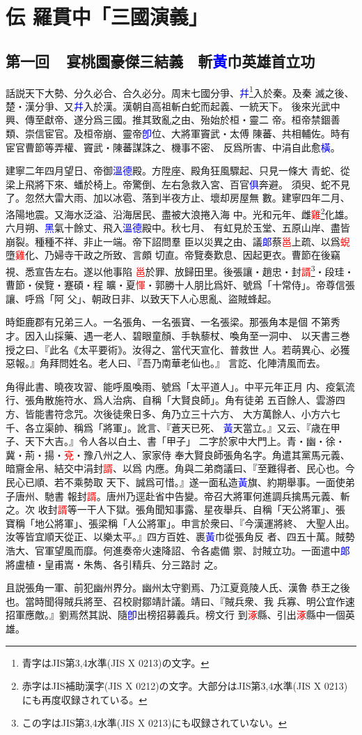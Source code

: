 \documentclass[twocolumn]{utarticle}
\newcommand{\hojo}[1]{\textcolor{red}{#1}}
\newcommand{\newjis}[1]{\textcolor{blue}{#1}}
\begin{document}
\section{伝 羅貫中「三國演義」}

\subsection*{第一回~~宴桃園豪傑三結義　斬\newjis{黃}巾英雄首立功}

話説天下大勢、分久必合、合久必分。周末七國分爭、\newjis{幷}\footnote{青字はJIS第3,4水準(JIS X 0213)の文字。}入於秦。及秦
滅之後、楚・漢分爭、又\newjis{幷}入於漢。漢朝自高祖斬白蛇而起義、一統天下。
後來光武中興、傳至獻帝、遂分爲三國。推其致亂之由、殆始於桓・靈二
帝。桓帝禁錮善類、崇信宦官。及桓帝崩、靈帝\newjis{卽}位、大將軍竇武・太傅
陳蕃、共相輔佐。時有宦官曹節等弄權、竇武・陳蕃謀誅之、機事不密、
反爲所害、中涓自此愈\newjis{橫}。

建寧二年四月望日、帝御\newjis{溫德}殿。方陞座、殿角狂風驟起、只見一條大
青蛇、從梁上飛將下來、蟠於椅上。帝驚倒、左右急救入宮、百官\newjis{俱}奔避。
須臾、蛇不見了。忽然大雷大雨、加以冰雹、落到半夜方止、壞却房屋無
數。建寧四年二月、洛陽地震。又海水泛溢、沿海居民、盡被大浪捲入海
中。光和元年、雌\hojo{雞}\footnote{赤字はJIS補助漢字(JIS X 0212)の文字。大部分はJIS第3,4水準(JIS X 0213)にも再度収録されている。}化雄。六月朔、\newjis{黑}氣十餘丈、飛入\newjis{溫德}殿中。秋七月、
有虹見於玉堂、五原山岸、盡皆崩裂。種種不祥、非止一端。帝下詔問羣
臣以災異之由、議\newjis{郞}蔡\hojo{邕}上疏、以爲\hojo{蜺}墮\hojo{雞}化、乃婦寺干政之所致、言頗
切直。帝覽奏歎息、因起更衣。曹節在後竊視、悉宣告左右。遂以他事陷
\hojo{邕}於罪、放歸田里。後張讓・趙忠・封\hojo{諝}\footnote{この字はJIS第3,4水準(JIS X 0213)にも収録されていない。}・段珪・曹節・侯覽・蹇碩・程
曠・夏\hojo{惲}・郭勝十人朋比爲奸、號爲「十常侍」。帝尊信張讓、呼爲「阿
父」、朝政日非、以致天下人心思亂、盜賊蜂起。

時鉅鹿郡有兄弟三人。一名張角、一名張寶、一名張梁。那張角本是個
不第秀才。因入山採藥、遇一老人、碧眼童顏、手執藜杖、喚角至一洞中、
以天書三巻授之曰、『此名《太平要術》。汝得之、當代天宣化、普救世
人。若萌異心、必獲惡報。』角拜問姓名。老人曰、『吾乃南華老仙也。』
言訖、化陣清風而去。

角得此書、曉夜攻習、能呼風喚雨、號爲「太平道人」。中平元年正月
内、疫氣流行、張角散施符水、爲人治病、自稱「大賢良師」。角有徒弟
五百餘人、雲游四方、皆能書符念咒。次後徒衆日多、角乃立三十六方、
大方萬餘人、小方六七千、各立渠帥、稱爲「將軍」。訛言、『蒼天已死、
\newjis{黃}天當立。』又云、『歳在甲子、天下大吉。』令人各以白土、書「甲子」
二字於家中大門上。青・幽・徐・冀・荊・揚・\hojo{兗}・豫八州之人、家家侍
奉大賢良師張角名字。角遣其黨馬元義、暗齎金帛、結交中涓封\hojo{諝}、以爲
内應。角與二弟商議曰、『至難得者、民心也。今民心已順、若不乘勢取
天下、誠爲可惜。』遂一面私造\newjis{黃}旗、約期舉事。一面使弟子唐州、馳書
報封\hojo{諝}。唐州乃逕赴省中告變。帝召大將軍何進調兵擒馬元義、斬之。次
收封\hojo{諝}等一干人下獄。張角聞知事露、星夜舉兵、自稱「天公將軍」、張
寶稱「地公將軍」、張梁稱「人公將軍」。申言於衆曰、『今漢運將終、
大聖人出。汝等皆宜順天從正、以樂太平。』四方百姓、裹\newjis{黃}巾從張角反
者、四五十萬。賊勢浩大、官軍望風而靡。何進奏帝火速降詔、令各處備
禦、討賊立功。一面遣中\newjis{郞}將盧植・皇甫嵩・朱雋、各引精兵、分三路討
之。

且説張角一軍、前犯幽州界分。幽州太守劉焉、乃江夏竟陵人氏、漢魯
恭王之後也。當時聞得賊兵將至、召校尉鄒靖計議。靖曰、『賊兵衆、我
兵寡、明公宜作速招軍應敵。』劉焉然其説、隨\newjis{卽}出榜招募義兵。榜文行
到\hojo{涿}縣、引出\hojo{涿}縣中一個英雄。
\end{document}
